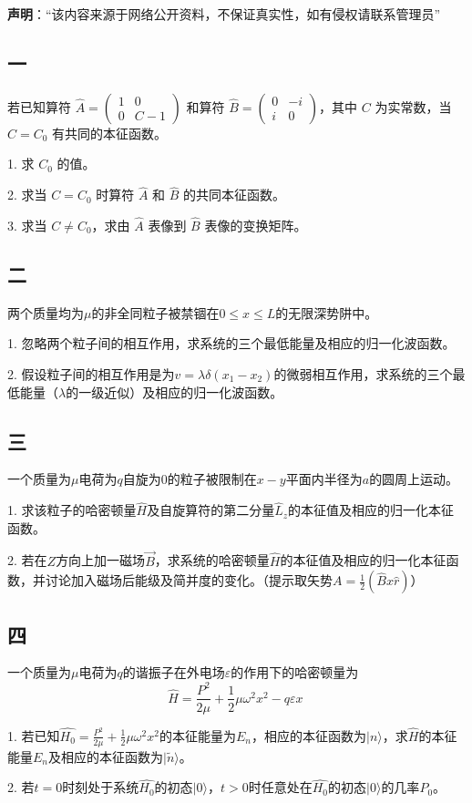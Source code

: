 
\textbf{声明}：“该内容来源于网络公开资料，不保证真实性，如有侵权请联系管理员”

\subsection{一}
若已知算符 $\hat{A} = \begin{pmatrix}
1 & 0 \\
0 & C - 1
\end{pmatrix}$ 和算符 $\hat{B} = \begin{pmatrix}
0 & -i \\
i & 0
\end{pmatrix}$，其中 $C$ 为实常数，当 $C = C_0$ 有共同的本征函数。

1. 求 $C_0$ 的值。

2. 求当 $C = C_0$ 时算符 $\hat{A}$ 和 $\hat{B}$ 的共同本征函数。

3. 求当 $C \neq C_0$，求由 $\hat{A}$ 表像到 $\hat{B}$ 表像的变换矩阵。

\subsection{二}
两个质量均为$\mu$的非全同粒子被禁锢在$0 \le x \le L$的无限深势阱中。

1. 忽略两个粒子间的相互作用，求系统的三个最低能量及相应的归一化波函数。

2. 假设粒子间的相互作用是为$v = \lambda \delta (x_1 - x_2)$的微弱相互作用，求系统的三个最低能量（$\lambda$的一级近似）及相应的归一化波函数。

\subsection{三}
一个质量为$\mu$电荷为$q$自旋为$0$的粒子被限制在$x-y$平面内半径为$a$的圆周上运动。

1. 求该粒子的哈密顿量$\hat H$及自旋算符的第二分量$\hat{L}_z$的本征值及相应的归一化本征函数。

2. 若在$Z$方向上加一磁场$\vec{B}$，求系统的哈密顿量$\hat{H}$的本征值及相应的归一化本征函数，并讨论加入磁场后能级及简并度的变化。（提示取矢势$A=\frac{1}{2}(\hat{B} x\hat{r})$）

\subsection{四}
一个质量为$\mu$电荷为$q$的谐振子在外电场$\varepsilon$的作用下的哈密顿量为
$$\hat{H} = \frac{P^2}{2\mu} + \frac{1}{2}\mu \omega^2 x^2 - q \varepsilon x~$$

1. 若已知$\hat{H_0} = \frac{P^2}{2\mu} + \frac{1}{2}\mu \omega^2 x^2$的本征能量为$E_n$，相应的本征函数为$|n\rangle$，求$\hat{H}$的本征能量$E_n$及相应的本征函数为$|\tilde n\rangle$。


2. 若$t=0$时刻处于系统$\hat{H_0}$的初态$|0\rangle$，$t>0$时任意处在$\hat{H_0}$的初态$|0\rangle$的几率$P_0$。
